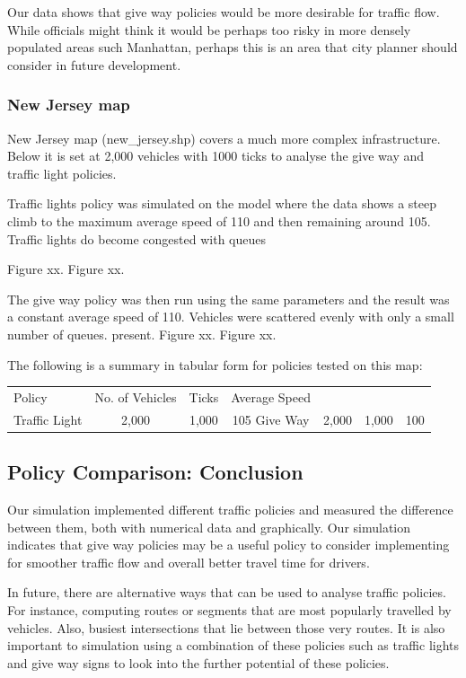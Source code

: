\documentclass[11pt]{article}
\begin{document}
\begin{enumerate}
Our data shows that give way policies would be more desirable for traffic flow. While officials might think it would be perhaps too risky in more densely populated areas such Manhattan, perhaps this is an area that city planner should consider in future development.

\subsubsection{New Jersey map}

New Jersey map (new\_jersey.shp)  covers a much more complex infrastructure. Below it is set at 2,000 vehicles with 1000 ticks to analyse the give way and traffic light policies.

Traffic lights policy was simulated on the model where the data shows a steep climb to the maximum average speed of 110 and then remaining around 105. Traffic lights do become congested with queues

Figure xx.
Figure xx.

The give way policy was then run using the same parameters and the result was a constant average speed of 110. Vehicles were scattered evenly with only a small number of queues. present.
Figure xx.
Figure xx.

The following is a summary in tabular form for policies tested on this map:
\begin{center}
\begin{tabular}{ l | c | c | c }
\hline
Policy & No. of Vehicles & Ticks & Average Speed \\
Traffic Light   & 2,000     &          1,000 &     105  
Give Way     &   2,000  &             1,000    &  100
\hline
\end{tabular}
\end{center}

\subsection{Policy Comparison: Conclusion}

Our simulation implemented different traffic policies and measured the difference between them, both with numerical data and graphically. Our simulation indicates that give way policies may be a useful policy to consider implementing for smoother traffic flow and overall better travel time for drivers.

In future, there are alternative ways that can be used to analyse traffic policies. For instance, computing routes or segments that are most popularly travelled by vehicles. Also, busiest intersections that lie between those very routes. It is also important to simulation using a combination of these policies such as traffic lights and give way signs to look into the further potential of these policies.







\end{enumerate}
\end{document}
